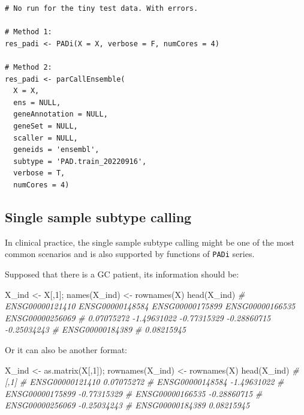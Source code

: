 \documentclass[
  12pt,
]{book}
\newenvironment{Shaded}{\begin{snugshade}}{\end{snugshade}}
\newcommand{\CommentTok}[1]{\textcolor[rgb]{0.56,0.35,0.01}{\textit{#1}}}
\newcommand{\DecValTok}[1]{\textcolor[rgb]{0.00,0.00,0.81}{#1}}
\newcommand{\FunctionTok}[1]{\textcolor[rgb]{0.00,0.00,0.00}{#1}}
\newcommand{\NormalTok}[1]{#1}
\newcommand{\OtherTok}[1]{\textcolor[rgb]{0.56,0.35,0.01}{#1}}
\begin{document}
\begin{verbatim}
# No run for the tiny test data. With errors.

# Method 1:
res_padi <- PADi(X = X, verbose = F, numCores = 4)

# Method 2: 
res_padi <- parCallEnsemble(
  X = X,
  ens = NULL,
  geneAnnotation = NULL,
  geneSet = NULL,
  scaller = NULL,
  geneids = 'ensembl',
  subtype = 'PAD.train_20220916',
  verbose = T,
  numCores = 4)
\end{verbatim}

\hypertarget{single-sample-subtype-calling}{%
\subsection{Single sample subtype calling}\label{single-sample-subtype-calling}}

In clinical practice, the single sample subtype calling might be one of the most common scenarios and is also supported by functions of \texttt{PADi} series.

Supposed that there is a GC patient, its information should be:

\begin{Shaded}
\begin{Highlighting}[]
\NormalTok{X\_ind }\OtherTok{\textless{}{-}}\NormalTok{ X[,}\DecValTok{1}\NormalTok{]; }\FunctionTok{names}\NormalTok{(X\_ind) }\OtherTok{\textless{}{-}} \FunctionTok{rownames}\NormalTok{(X)}
\FunctionTok{head}\NormalTok{(X\_ind)}
\CommentTok{\# ENSG00000121410 ENSG00000148584 ENSG00000175899 ENSG00000166535 ENSG00000256069 }
\CommentTok{\#      0.07075272     {-}1.49631022     {-}0.77315329     {-}0.28860715     {-}0.25034243 }
\CommentTok{\# ENSG00000184389 }
\CommentTok{\#      0.08215945}
\end{Highlighting}
\end{Shaded}

Or it can also be another format:

\begin{Shaded}
\begin{Highlighting}[]
\NormalTok{X\_ind }\OtherTok{\textless{}{-}} \FunctionTok{as.matrix}\NormalTok{(X[,}\DecValTok{1}\NormalTok{]); }\FunctionTok{rownames}\NormalTok{(X\_ind) }\OtherTok{\textless{}{-}} \FunctionTok{rownames}\NormalTok{(X)}
\FunctionTok{head}\NormalTok{(X\_ind)}
\CommentTok{\#                        [,1]}
\CommentTok{\# ENSG00000121410  0.07075272}
\CommentTok{\# ENSG00000148584 {-}1.49631022}
\CommentTok{\# ENSG00000175899 {-}0.77315329}
\CommentTok{\# ENSG00000166535 {-}0.28860715}
\CommentTok{\# ENSG00000256069 {-}0.25034243}
\CommentTok{\# ENSG00000184389  0.08215945}
\end{Highlighting}
\end{Shaded}
\end{document}
